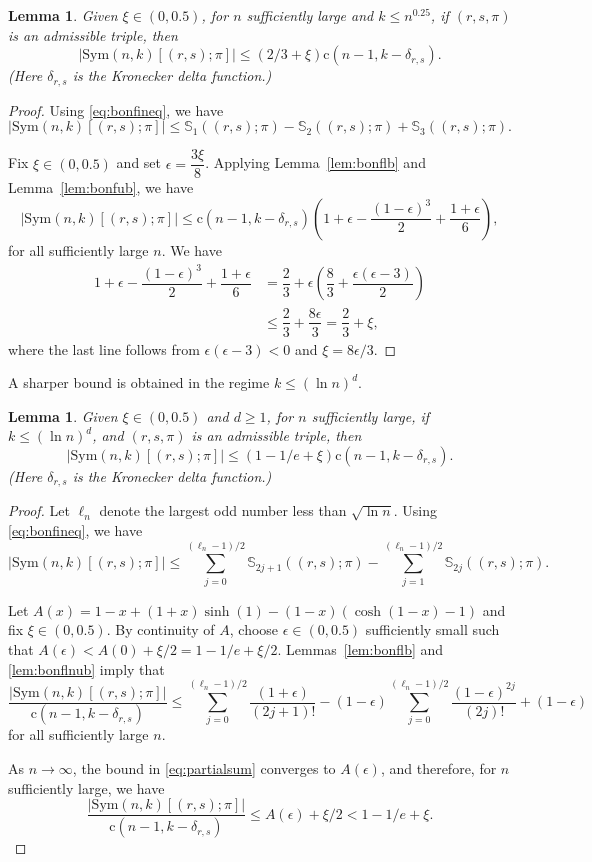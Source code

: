 \documentclass{amsart}
\newtheorem{lem}[thm]{Lemma}
\newcommand{\bb}{\mathbb}
\newcommand{\sym}{\mathrm{Sym}}
\newcommand{\st}{\mathrm{c}}
\begin{document}
\begin{lem}\label{lem:HMub}
Given $\xi\in (0,0.5)$, for $n$ sufficiently large and $k\leq n^{0.25}$, if $(r,s,\pi)$ is an admissible triple, then
\[|\sym(n,k)[(r,s);\pi]| \leq (2/3 +\xi)\st(n-1,k-\delta_{r,s}).\] (Here $\delta_{r,s}$ is the Kronecker delta function.)
\end{lem}
\begin{proof}
Using \eqref{eq:bonfineq}, we have 
\[|\sym(n,k)[(r,s);\pi]| \leq \bb{S}_{1}((r,s);\pi)-\bb{S}_{2}((r,s);\pi)+\bb{S}_{3}((r,s);\pi).\]

Fix $\xi \in (0,0.5)$ and set $\epsilon=\dfrac{3\xi}{8}$.
 Applying Lemma~\ref{lem:bonflb} and Lemma~\ref{lem:bonfub}, we have
\[|\sym(n,k)[(r,s);\pi]|\leq \st(n-1,k-\delta_{r,s}) \left( 1+\epsilon -\dfrac{(1-\epsilon)^{3}}{2} +\dfrac{1+\epsilon}{6}\right),\] for all sufficiently large $n$.
We have
\begin{align*}
1+\epsilon -\dfrac{(1-\epsilon)^{3}}{2} +\dfrac{1+\epsilon}{6} &=\dfrac{2}{3}+\epsilon\left(\dfrac{8}{3} + \dfrac{\epsilon(\epsilon-3)}{2} \right) \\
&\leq \dfrac{2}{3} +\dfrac{8 \epsilon}{3}=\dfrac{2}{3} +\xi,
\end{align*}
where the last line follows from $\epsilon(\epsilon-3)<0$ and $\xi= 8\epsilon/3$.
\end{proof}
A sharper bound is obtained in the regime $k\leq (\ln n)^{d}$.
\begin{lem}\label{lem:HMubln}
Given $\xi\in (0,0.5)$ and $d\geq 1$, for $n$ sufficiently large, if $k\leq (\ln n)^{d}$, and $(r,s,\pi)$ is an admissible triple, then
\[|\sym(n,k)[(r,s);\pi]| \leq (1-1/e +\xi)\st(n-1,k-\delta_{r,s}).\] (Here $\delta_{r,s}$ is the Kronecker delta function.)
\end{lem}
\begin{proof}
Let $\ell_{n}$ denote the largest odd number less than $\sqrt{\ln n}$. Using \eqref{eq:bonfineq}, we have
\[|\sym(n,k)[(r,s);\pi]| \leq \sum\limits_{j=0}^{(\ell_{n}-1)/2} \bb{S}_{2j+1}((r,s);\pi) - \sum\limits_{j=1}^{(\ell_{n}-1)/2}\bb{S}_{2j}((r,s);\pi).\]

Let $A(x)=1-x +(1+x)\sinh(1)-(1-x)(\cosh(1-x)-1)$ and fix $\xi\in (0,0.5)$. By continuity of $A$, choose $\epsilon \in (0,0.5)$ sufficiently small such that $A(\epsilon)<A(0)+\xi/2=1-1/e+\xi/2$. Lemmas~\ref{lem:bonflb} and \ref{lem:bonflnub} imply that 
\begin{equation}\label{eq:partialsum}
\dfrac{|\sym(n,k)[(r,s);\pi]|}{\st(n-1,k-\delta_{r,s})} \leq \sum\limits_{j=0}^{(\ell_{n}-1)/2} \dfrac{(1+\epsilon)}{(2j+1)!} - (1-\epsilon)\sum\limits_{j=0}^{(\ell_{n}-1)/2}\dfrac{(1-\epsilon)^{2j}}{(2j)!} + (1-\epsilon)
\end{equation}
for all sufficiently large $n$.

As $n\to \infty$, the bound in \eqref{eq:partialsum} converges to $A(\epsilon)$, and therefore, for $n$ sufficiently large, we have
\[\dfrac{|\sym(n,k)[(r,s);\pi]|}{\st(n-1,k-\delta_{r,s})}\leq A(\epsilon)+\xi/2 < 1-1/e+\xi.\]
\end{proof}
\end{document}
